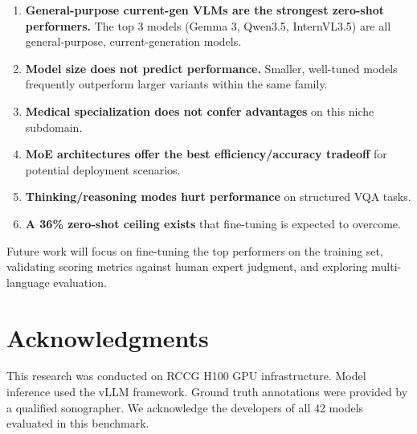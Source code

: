 \documentclass[11pt,a4paper]{article}
\begin{document}
\begin{enumerate}
    \item \textbf{General-purpose current-gen VLMs are the strongest zero-shot performers.} The top 3 models (Gemma 3, Qwen3.5, InternVL3.5) are all general-purpose, current-generation models.
    \item \textbf{Model size does not predict performance.} Smaller, well-tuned models frequently outperform larger variants within the same family.
    \item \textbf{Medical specialization does not confer advantages} on this niche subdomain.
    \item \textbf{MoE architectures offer the best efficiency/accuracy tradeoff} for potential deployment scenarios.
    \item \textbf{Thinking/reasoning modes hurt performance} on structured VQA tasks.
    \item \textbf{A 36\% zero-shot ceiling exists} that fine-tuning is expected to overcome.
\end{enumerate}

Future work will focus on fine-tuning the top performers on the training set, validating scoring metrics against human expert judgment, and exploring multi-language evaluation.

\section*{Acknowledgments}

This research was conducted on RCCG H100 GPU infrastructure. Model inference used the vLLM framework. Ground truth annotations were provided by a qualified sonographer. We acknowledge the developers of all 42 models evaluated in this benchmark.
\end{document}
